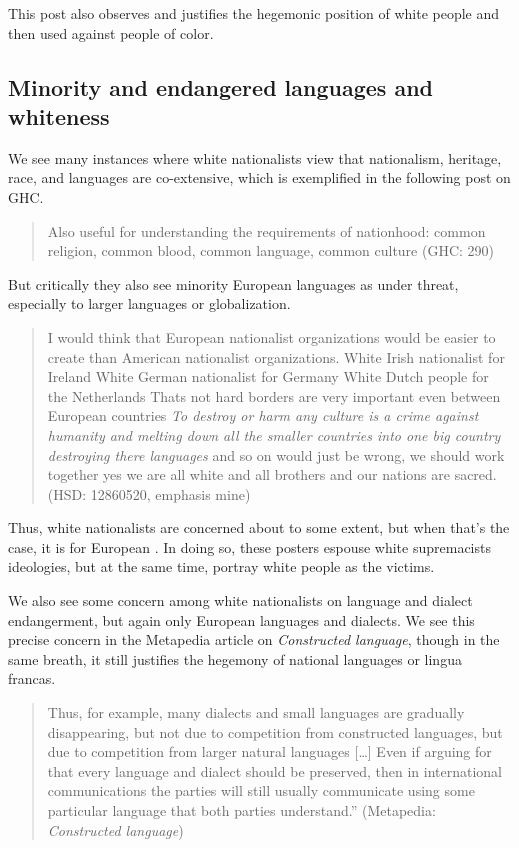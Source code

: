 \documentclass[output=paper,colorlinks,citecolor=brown]{langscibook}
\begin{document}
\noindent This post also observes and justifies the hegemonic position of white people and then used against people of color.


\subsection{Minority and endangered languages and whiteness}

We see many instances where white nationalists view that nationalism, heritage, race, and languages are co-extensive, which is exemplified in the following post on GHC.

\begin{quote} 
Also useful for understanding the requirements of nationhood: common religion, common blood, common language, common culture (GHC: 290)
\end{quote}

\noindent But critically they also see minority European languages as under threat, especially to larger languages or globalization.

\begin{quote} 
I would think that European nationalist organizations would be easier to create than American nationalist organizations. White Irish nationalist for Ireland White German nationalist for Germany White Dutch people for the Netherlands Thats not hard borders are very important even between European countries \emph{To destroy or harm any culture is a crime against humanity and melting down all the smaller countries into one big country destroying there languages} and so on would just be wrong, we should work together yes we are all white and all brothers and our nations are sacred. (HSD: 12860520, emphasis mine) 
\end{quote}

\noindent Thus,  white nationalists are concerned about  to some extent, but when that's the case, it is for European . In doing so, these posters espouse white supremacists ideologies, but at the same time, portray white people as the victims.

We also see some concern among white nationalists on language and dialect endangerment, but again only European languages and dialects. We see this precise concern in the Metapedia article on \emph{Constructed language}, though in the same breath, it still justifies the hegemony of national languages or lingua francas.

\begin{quote} 
Thus, for example, many dialects and small languages are gradually disappearing, but not due to competition from constructed languages, but due to competition from larger natural languages {[}\ldots{]} Even if arguing for that every language and dialect should be preserved, then in international communications the parties will still usually communicate using some particular language that both parties understand.'' (Metapedia: \emph{Constructed language}) 
\end{quote}
\end{document}
